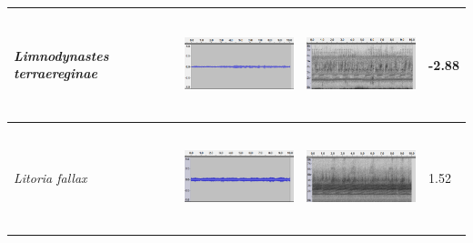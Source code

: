 \begin{table}[htb!]
{\begin{tabular}{llll}
\textit{Limnodynastes terraereginae} &  \begin{minipage}{.3\textwidth} \includegraphics[width=45mm, height=30mm]{image/Ch1/ter_jcu_wav.png}  \end{minipage}        &   \begin{minipage}{.3\textwidth} \includegraphics[width=45mm, height=30mm]{image/Ch1/ter_jcu_spec.png}  \end{minipage}          & -2.88    \\ \hline
\textit{Litoria fallax}              &   \begin{minipage}{.3\textwidth} \includegraphics[width=45mm, height=30mm]{image/Ch1/fallax_jcu_wav.png}  \end{minipage}       &    \begin{minipage}{.3\textwidth} \includegraphics[width=45mm, height=30mm]{image/Ch1/fallax_jcu_spec.png}  \end{minipage}         & 1.52     \\ \hline
\end{tabular}
}
\end{table}


